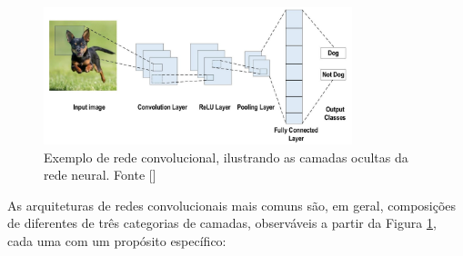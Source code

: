 \begin{figure}
    \centering
    \includegraphics[width=0.8\textwidth]{figs/theory-cnn-example.png}
    \caption{Exemplo de rede convolucional, ilustrando as camadas ocultas da rede neural. Fonte []}
    \label{fig:theory-cnn-example}
\end{figure}

As arquiteturas de redes convolucionais mais comuns são, em geral, composições de diferentes de três categorias de camadas, observáveis 
a partir da Figura \ref{fig:theory-cnn-example}, cada uma com um propósito específico:

